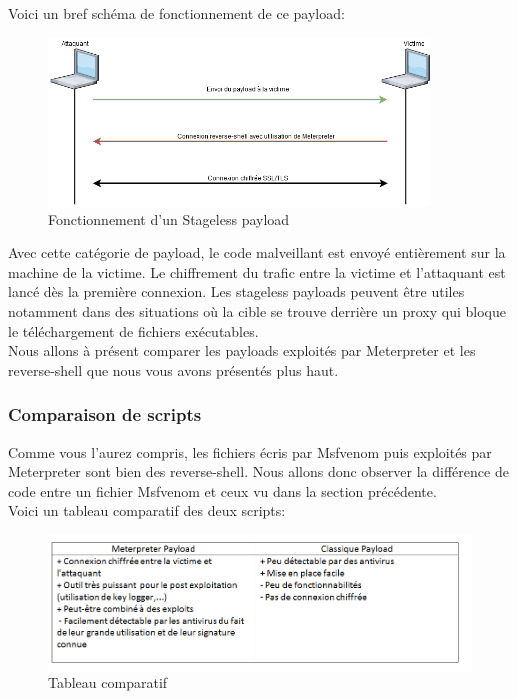 Voici un bref schéma de fonctionnement de ce payload:


\begin{figure}[htp!]
  \centering
  \setlength\figureheight{7cm}
  \setlength\figurewidth{9cm}
  \includegraphics[width=0.9\textwidth]{oui/images/Reverse_shell-meterpreter/Untitled Diagram(4).png}
  \caption{Fonctionnement d'un Stageless payload}
  \label{fig:courbe-tikz}
\end{figure}

 Avec cette catégorie de payload, le code malveillant est envoyé entièrement sur la machine de la victime.
Le chiffrement du trafic entre la victime et l’attaquant est lancé dès la première connexion.
Les stageless payloads peuvent être utiles notamment dans des situations où la cible se trouve derrière un proxy qui bloque le téléchargement de fichiers exécutables.\\
Nous allons à présent comparer les payloads exploités par Meterpreter et les reverse-shell que nous vous avons présentés plus haut.

\subsubsection{Comparaison de scripts}

Comme vous l'aurez compris, les fichiers écris par Msfvenom puis exploités par Meterpreter sont bien des reverse-shell. Nous allons donc observer la différence de code entre un fichier Msfvenom et ceux vu dans la section précédente.\\

Voici un tableau comparatif des deux scripts:

\begin{figure}[htp!]
  \centering
  \setlength\figureheight{7cm}
  \setlength\figurewidth{9cm}
  \includegraphics[width=1\textwidth]{oui/images/Reverse_shell-meterpreter/payload.PNG}
  \caption{Tableau comparatif}
  \label{fig:courbe-tikz}
\end{figure}
